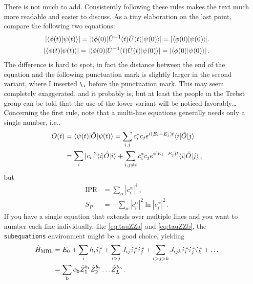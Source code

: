 There is not much to add. Consistently following these rules makes the text much more readable and easier to discuss. As a tiny elaboration on the last point, compare the following two equations:
\begin{align}
	|\langle \phi (t) | \psi(t) \rangle| = |\langle \phi(0) | \hat{U}^{-1}(t) \hat{U}(t) | \psi(0)  \rangle| = |\langle \phi (0) | \psi(0) \rangle|. \\ 
	|\langle \phi (t) | \psi(t) \rangle| = |\langle \phi(0) | \hat{U}^{-1}(t) \hat{U}(t) | \psi(0)  \rangle| = |\langle \phi (0) | \psi(0) \rangle|\,.
\end{align}
The difference is hard to spot, in fact the distance between the end of the equation and the following punctuation mark is slightly larger in the second variant, where I inserted \verb|\,| before the punctuation mark.
This may seem completely exaggerated, and it probably is, but at least the people in the Trebst group can be told that the use of the lower variant will be noticed favorably\ldots
Concerning the first rule, note that a multi-line equations generally needs only a single number, i.e.,
\begin{align}
	O(t) &= \langle \psi(t) | \hat{O} | \psi(t) \rangle = \sum_{i,j} c_i^* c_j e^{i \left( E_i - E_j \right)t} \langle i |\hat{O}| j\rangle  \nonumber \\ & = \sum_i |c_i|^2 \langle i |\hat{O}| i \rangle + \sum_{i,j\neq i} c_i^*c_j e^{i \left( E_i - E_j \right) t} \langle i |\hat{O}| j\rangle\,,
\end{align}
but
\begin{align} 
	\mathrm{IPR} &= \sum_\alpha |c_i^\alpha|^4\,,\\
	S_P &= - \sum_\alpha |c_i^\alpha|^2 \ln |c_i^\alpha|^2 \,.
\end{align}
If you have a single equation that extends over multiple lines and you want to number each line individually, like \eqref{eq:tauZZa} and \eqref{eq:tauZZb}, the \verb|subequations| environment might be a good choice, yielding
\begin{subequations}
\begin{align}
	\hat{H}_\text{MBL} &= E_0 + \sum \limits_i h_i \hat{\tau}_i^z + \sum \limits_{i>j} J_{ij} \hat{\tau}_i^z \hat{\tau}_j^z + \sum \limits_{i>j>k} J_{ijk} \hat{\tau}_i^z \hat{\tau}_j^z \hat{\tau}_k^z + \dots \label{eq:tauZZa} \\&= \sum_{\textbf{b}} c_{\textbf{b}} \hat{Z}_1^{b_1} \hat{Z}_2^{b_2} \dots \hat{Z}_L^{b_L}\,. \label{eq:tauZZb}
\end{align}
\end{subequations}

